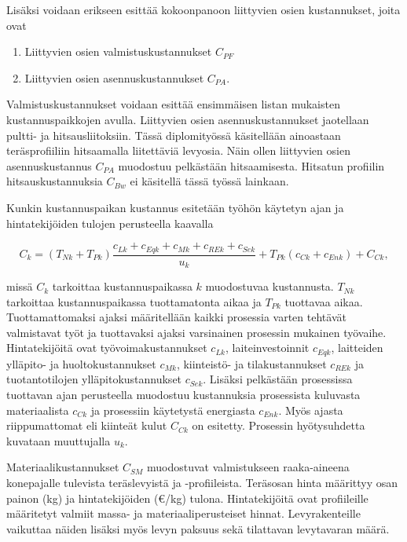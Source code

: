 \documentclass[12pt]{article}
\newenvironment{content}{\pagenumbering{arabic}}{}
\begin{document}
\begin{content}
Lisäksi voidaan erikseen esittää kokoonpanoon liittyvien osien kustannukset, joita ovat 

\begin{enumerate}
\item Liittyvien osien valmistuskustannukset $C_{PF}$
\item Liittyvien osien asennuskustannukset $C_{PA}$.
\end{enumerate}

Valmistuskustannukset voidaan esittää ensimmäisen listan mukaisten kustannuspaikkojen avulla. Liittyvien osien asennuskustannukset jaotellaan pultti- ja hitsausliitoksiin. Tässä diplomityössä käsitellään ainoastaan teräsprofiiliin hitsaamalla liitettäviä levyosia. Näin ollen liittyvien osien asennuskustannus  $C_{PA}$ muodostuu pelkästään hitsaamisesta. Hitsatun profiilin hitsauskustannuksia $C_{Bw}$ ei käsitellä tässä työssä lainkaan. 

Kunkin kustannuspaikan kustannus esitetään työhön käytetyn ajan ja hintatekijöiden tulojen perusteella kaavalla

\begin{equation}
\label{kustannuspaikka}
C_k = (T_{Nk} + T_{Pk}) \frac{c_{Lk} + c_{Eqk} + c_{Mk} + c_{REk} + c_{Sek}}{u_k} + T_{Pk} (c_{Ck} + c_{Enk})+C_{Ck},
\end{equation}  

missä $C_k$ tarkoittaa kustannuspaikassa $k$ muodostuvaa kustannusta. $T_{Nk}$ tarkoittaa kustannuspaikassa tuottamatonta aikaa ja $T_{Pk}$ tuottavaa aikaa. Tuottamattomaksi ajaksi määritellään kaikki prosessia varten tehtävät valmistavat työt ja tuottavaksi ajaksi varsinainen prosessin mukainen työvaihe. Hintatekijöitä ovat työvoimakustannukset $c_{Lk}$, laiteinvestoinnit $c_{Eqk}$, laitteiden ylläpito- ja huoltokustannukset $c_{Mk}$, kiinteistö- ja tilakustannukset $c_{REk}$ ja tuotantotilojen ylläpitokustannukset $c_{Sek}$. Lisäksi pelkästään prosessissa tuottavan ajan perusteella muodostuu kustannuksia prosessista kuluvasta materiaalista $c_{Ck}$ ja prosessiin käytetystä energiasta $c_{Enk}$. Myös ajasta riippumattomat eli kiinteät kulut $C_{Ck}$ on esitetty. Prosessin hyötysuhdetta kuvataan muuttujalla $u_k$. \parencite{haapio}

Materiaalikustannukset $C_{SM}$ muodostuvat valmistukseen raaka-aineena konepajalle tulevista teräslevyistä ja -profiileista. Teräsosan hinta määrittyy osan painon (kg) ja hintatekijöiden (\euro{}/kg) tulona. Hintatekijöitä ovat profiileille määritetyt valmiit massa- ja materiaaliperusteiset hinnat. Levyrakenteille vaikuttaa näiden lisäksi myös levyn paksuus sekä tilattavan levytavaran määrä.


\end{content}
\end{document}

